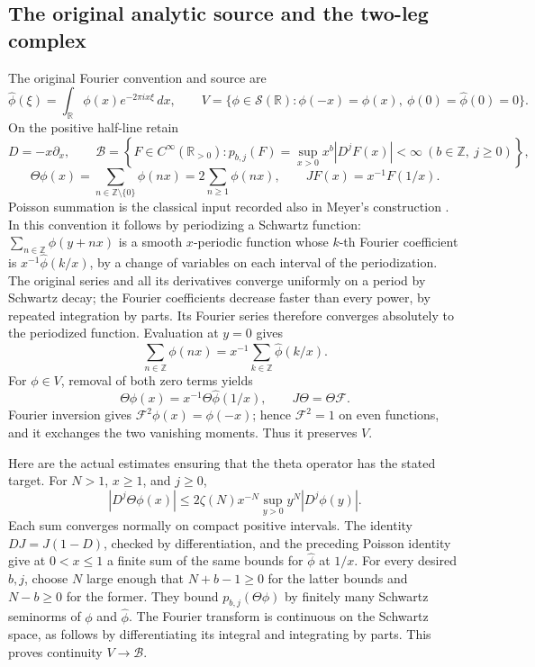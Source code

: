 \subsection{The original analytic source and the two-leg complex}
\label{app:theta-source}

The original Fourier convention and source are
\[
\widehat\phi(\xi)=\int_{\mathbb R}\phi(x)e^{-2\pi ix\xi}\,dx,
\qquad
V=\{\phi\in\mathcal S(\mathbb R):
\phi(-x)=\phi(x),\ \phi(0)=\widehat\phi(0)=0\}.
\]
On the positive half-line retain
\[
D=-x\partial_x,\qquad
\mathscr B=\left\{F\in C^\infty(\mathbb R_{>0}):
p_{b,j}(F)=\sup_{x>0}x^b|D^jF(x)|<\infty\
(b\in\mathbb Z,\ j\ge0)\right\},
\]
\[
\Theta\phi(x)=\sum_{n\in\mathbb Z\setminus\{0\}}\phi(nx)
=2\sum_{n\ge1}\phi(nx),\qquad JF(x)=x^{-1}F(1/x).
\]
Poisson summation is the classical input recorded also in
Meyer's construction \cite[\S3, equation (11)]{Meyer2005}.
In this convention it follows by periodizing a Schwartz function:
\(\sum_{n\in\mathbb Z}\phi(y+nx)\) is a smooth \(x\)-periodic
function whose \(k\)-th Fourier coefficient is
\(x^{-1}\widehat\phi(k/x)\), by a change of variables on each
interval of the periodization. The original series and all
its derivatives converge uniformly on a period by Schwartz
decay; the Fourier coefficients decrease faster than every
power, by repeated integration by parts. Its Fourier series
therefore converges absolutely to the periodized function.
Evaluation at \(y=0\) gives
\[
\sum_{n\in\mathbb Z}\phi(nx)
=x^{-1}\sum_{k\in\mathbb Z}\widehat\phi(k/x).
\]
For \(\phi\in V\), removal of both zero terms yields
\[
\Theta\phi(x)=x^{-1}\Theta\widehat\phi(1/x),
\qquad J\Theta=\Theta\mathcal F.
\]
Fourier inversion gives \(\mathcal F^2\phi(x)=\phi(-x)\);
hence \(\mathcal F^2=1\) on even functions, and it exchanges
the two vanishing moments. Thus it preserves \(V\).

Here are the actual estimates ensuring that the theta operator
has the stated target. For \(N>1\), \(x\ge1\), and \(j\ge0\),
\[
|D^j\Theta\phi(x)|
\le2\zeta(N)x^{-N}\sup_{y>0}y^N|D^j\phi(y)|.
\]
Each sum converges normally on compact positive intervals.
The identity \(DJ=J(1-D)\), checked by differentiation, and
the preceding Poisson identity give at \(0<x\le1\) a finite
sum of the same bounds for \(\widehat\phi\) at \(1/x\).
For every desired \(b,j\), choose \(N\) large enough that
\(N+b-1\ge0\) for the latter bounds and \(N-b\ge0\) for the
former. They bound \(p_{b,j}(\Theta\phi)\) by finitely many
Schwartz seminorms of \(\phi\) and \(\widehat\phi\).
The Fourier transform is continuous on the Schwartz space,
as follows by differentiating its integral and integrating
by parts. This proves continuity \(V\to\mathscr B\).

